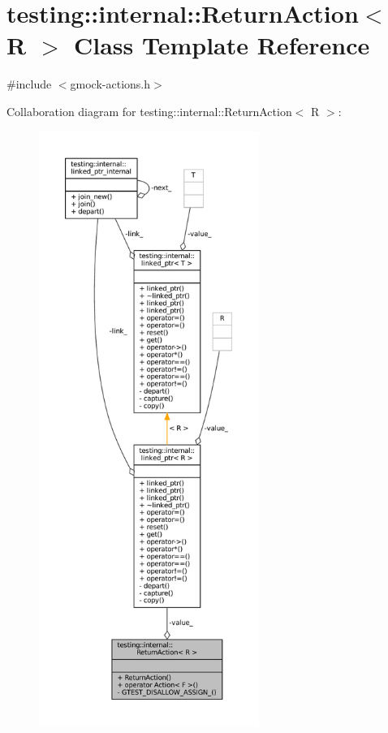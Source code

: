 \hypertarget{classtesting_1_1internal_1_1ReturnAction}{}\section{testing\+:\+:internal\+:\+:Return\+Action$<$ R $>$ Class Template Reference}
\label{classtesting_1_1internal_1_1ReturnAction}


{\ttfamily \#include $<$gmock-\/actions.\+h$>$}



Collaboration diagram for testing\+:\+:internal\+:\+:Return\+Action$<$ R $>$\+:
\nopagebreak
\begin{figure}[H]
\begin{center}
\leavevmode
\includegraphics[height=550pt]{classtesting_1_1internal_1_1ReturnAction__coll__graph}
\end{center}
\end{figure}
